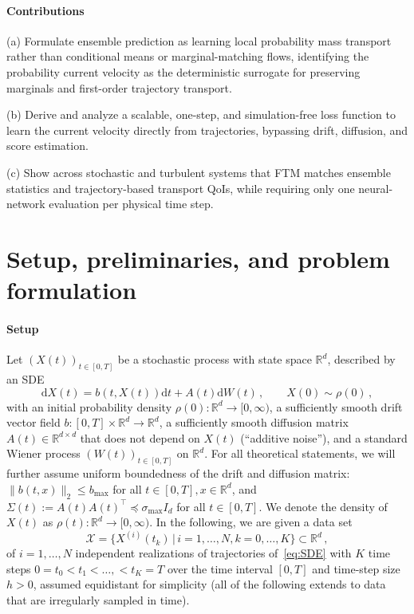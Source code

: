 \documentclass[oneside,11pt]{article}
\theoremstyle{remark}
\begin{document}
\paragraph{Contributions}
(a) Formulate ensemble prediction as learning local probability mass transport rather than conditional means or marginal-matching flows, identifying the probability current velocity as the  deterministic surrogate for preserving  marginals and first-order trajectory transport. 


(b) Derive and analyze a scalable, one-step, and simulation-free loss function to learn the current velocity directly from trajectories, bypassing drift, diffusion, and score estimation. 

(c) Show across stochastic and turbulent systems that FTM matches ensemble statistics and trajectory-based transport QoIs, while requiring only one neural-network evaluation per physical time step. 






\section{Setup, preliminaries, and problem formulation}
\paragraph{Setup}
Let $(X(t))_{t \in [0,T]}$ be a stochastic process with state space $\mathbb{R}^d$, described by an SDE
\begin{equation}\label{eq:SDE}
\mathrm dX(t) = b(t, X(t))\mathrm dt + A(t)\mathrm dW(t)\,,\qquad X(0) \sim \rho(0)\,,
\end{equation}
with an initial probability density $\rho(0) \colon \mathbb{R}^d \to [0,\infty)$, a sufficiently smooth drift vector field $b \colon [0, T] \times \mathbb{R}^d \to \mathbb{R}^d$, a sufficiently smooth diffusion matrix $A(t) \in \mathbb{R}^{d \times d}$ that does not depend on $X(t)$ (``additive noise''), and a standard Wiener process $(W(t))_{t \in [0,T]}$ on $\mathbb{R}^d$. For all theoretical statements, we will further assume uniform boundedness of the drift and diffusion matrix: $\lVert b(t,x) \rVert_2 \leq b_{\max}$ for all $t \in [0,T],x \in \mathbb{R}^d$, and $\Sigma(t) := A(t) A(t)^\top \preceq \sigma_{\max} I_d$ for all $t \in [0,T]$. We denote the density of $X(t)$ as $\rho(t)\colon \mathbb{R}^d \to [0,\infty)$.
In the following, we are given a data set
\begin{equation}\label{eq:TrainingData}
\mathcal{X} = \{X^{(i)}(t_k) \,|\, i = 1, \dots, N, k = 0, \dots, K\} \subset \mathbb{R}^d\,,
\end{equation}
of $i = 1, \dots, N$ independent realizations of trajectories of~\eqref{eq:SDE} with $K$ time steps $0 = t_0 < t_1 < \dots, < t_K = T$ over the time interval $[0, T]$ and time-step size $h > 0$, assumed equidistant for simplicity (all of the following extends to data that are irregularly sampled in time).
\end{document}
